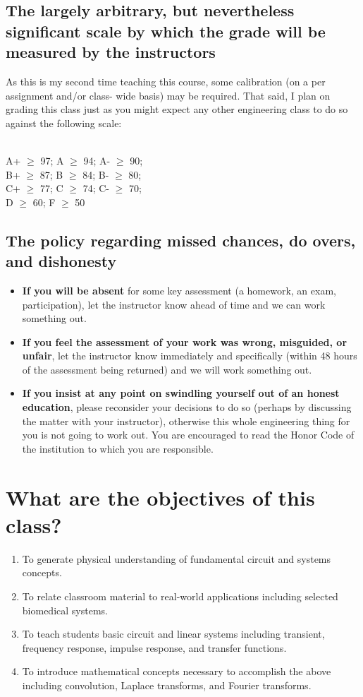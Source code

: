 \documentclass[11pt]{book}
\begin{document}
\subsection{The largely arbitrary, but nevertheless significant scale by which the grade will be measured by the instructors}
As this is my second time teaching this course, some calibration (on a per assignment and/or class- wide basis) may be required. That said, I plan on grading this class just as you might expect any other engineering class to do so against the following scale: \\
\\
\begin{center}
	A+ $\geq$ 97; A $\geq$ 94; A- $\geq$ 90; \\
	B+ $\geq$ 87; B $\geq$ 84; B- $\geq$ 80; \\
	C+ $\geq$ 77; C $\geq$ 74; C- $\geq$ 70; \\
	D $\geq$ 60; F $\geq$ 50
\end{center}

\subsection{The policy regarding missed chances, do overs, and dishonesty}
\begin{itemize}
	\item \textbf{If you will be absent} for some key assessment (a homework, an exam, participation), let the instructor know ahead of time and we can work something out.
	\item \textbf{If you feel the assessment of your work was wrong, misguided, or unfair}, let the instructor know immediately and specifically (within 48 hours of the assessment being returned) and we will work something out. 
	\item \textbf{If you insist at any point on swindling yourself out of an honest education}, please reconsider your decisions to do so (perhaps by discussing the matter with your instructor), otherwise this whole engineering thing for you is not going to work out. You are encouraged to read the Honor Code of the institution to which you are responsible.
\end{itemize}

\section{What are the objectives of this class?}
\begin{enumerate}
	\item To generate physical understanding of fundamental circuit and systems concepts.
	\item To relate classroom material to real-world applications including selected biomedical systems.
	\item To teach students basic circuit and linear systems including transient, frequency response, impulse response, and transfer functions.
	\item To introduce mathematical concepts necessary to accomplish the above including convolution, Laplace transforms, and Fourier transforms.
\end{enumerate}
\end{document}
